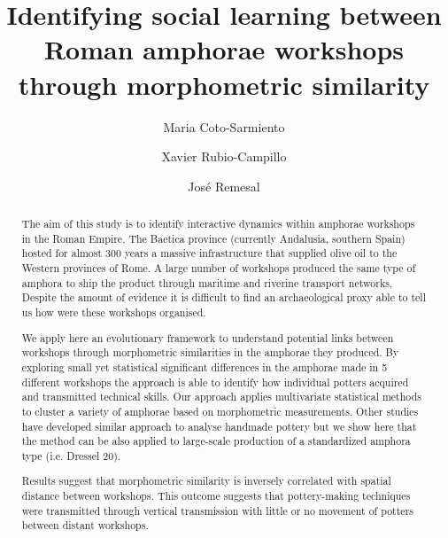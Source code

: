 \documentclass[review]{elsarticle}
\begin{document}
\begin{frontmatter}

\title{Identifying social learning between Roman amphorae workshops through morphometric similarity}


\author[bscadress]{Maria Coto-Sarmiento}


\author[edadress]{Xavier Rubio-Campillo}
\author[ceipacadress]{Jos\'e Remesal}


\address[bscadress]{Barcelona Supercomputing Center (BSC), Jordi Girona 29, Office 3A, Nexus II Building, 08034, Barcelona, Spain}
\address[edadress]{School of History, Classic \& Archaeology, Room OOM.33, William Robertson Wing, Old Medical School, Teviot Place, University of Edinburgh, UK}
\address[ceipacadress]{CEIPAC, Department of Prehistory and Archaeology, Montalegre, 6-8, 08001, University of Barcelona, Barcelona, Spain}

\begin{abstract}

The aim of this study is to identify interactive dynamics within amphorae workshops in the Roman Empire. The Baetica province (currently Andalusia, southern Spain) hosted for almost 300 years a massive infrastructure that supplied olive oil to the Western provinces of Rome. A large number of workshops produced the same type of amphora to ship the product through maritime and riverine transport networks. Despite the amount of evidence it is difficult to find an archaeological proxy able to tell us how were these workshops organised.

We apply here an evolutionary framework to understand potential links between workshops through morphometric similarities in the amphorae they produced. By exploring small yet statistical significant differences in the amphorae made in 5 different workshops the approach is able to identify how individual potters acquired and transmitted technical skills.  Our approach applies multivariate statistical methods to cluster a variety of amphorae based on morphometric measurements. Other studies have developed similar approach to analyse handmade pottery but we show here that the method can be also applied to large-scale production of a standardized amphora type (i.e. Dressel 20).

Results suggest that morphometric similarity is inversely correlated with spatial distance between workshops. This outcome suggests that pottery-making techniques were transmitted through vertical transmission with little or no movement of potters between distant workshops.


\end{abstract}
\end{frontmatter}
\end{document}
